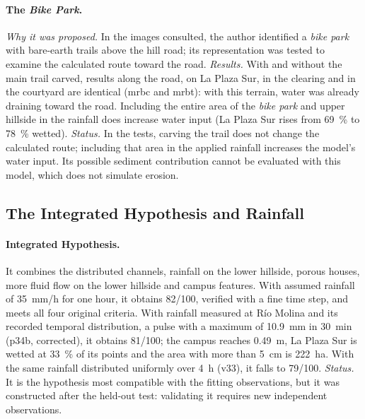 \paragraph{The \emph{Bike Park}.} \emph{Why it was proposed.} In the images consulted, the author identified a \emph{bike park} with bare-earth trails above the hill road; its representation was tested to examine the calculated route toward the road. \emph{Results.} With and without the main trail carved, results along the road, on La Plaza Sur, in the clearing and in the courtyard are identical (mrbc and mrbt): with this terrain, water was already draining toward the road. Including the entire area of the \emph{bike park} and upper hillside in the rainfall does increase water input (La Plaza Sur rises from \SI{69}{\percent} to \SI{78}{\percent} wetted). \emph{Status.} In the tests, carving the trail does not change the calculated route; including that area in the applied rainfall increases the model’s water input. Its possible sediment contribution cannot be evaluated with this model, which does not simulate erosion.

\subsection{The Integrated Hypothesis and Rainfall}
\paragraph{Integrated Hypothesis.} It combines the distributed channels, rainfall on the lower hillside, porous houses, more fluid flow on the lower hillside and campus features. With assumed rainfall of \SI{35}{mm/h} for one hour, it obtains 82/100, verified with a fine time step, and meets all four original criteria. With rainfall measured at Río Molina and its recorded temporal distribution, a pulse with a maximum of \SI{10.9}{mm} in \SI{30}{min} (p34b, corrected), it obtains 81/100; the campus reaches \SI{0.49}{m}, La Plaza Sur is wetted at \SI{33}{\percent} of its points and the area with more than \SI{5}{cm} is \SI{222}{ha}. With the same rainfall distributed uniformly over \SI{4}{h} (v33), it falls to 79/100.
\emph{Status.} It is the hypothesis most compatible with the fitting observations, but it was constructed after the held-out test: validating it requires new independent observations.

